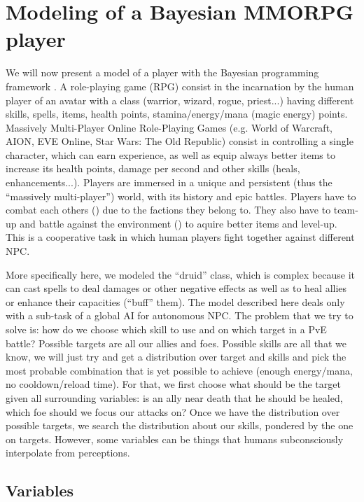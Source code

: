 \section{Modeling of a Bayesian MMORPG player}
We will now present a model of a  player with the Bayesian programming framework \citep{SYNNAEVE:MMORPG}. A role-playing game (RPG) consist in the incarnation by the human player of an avatar with a class (warrior, wizard, rogue, priest...) having different skills, spells, items, health points, stamina/energy/mana (magic energy) points. Massively Multi-Player Online Role-Playing Games (e.g. World of Warcraft, AION, EVE Online, Star Wars: The Old Republic) consist in controlling a single character, which can earn experience, as well as equip always better items to increase its health points, damage per second and other skills (heals, enhancements...). Players are immersed in a unique and persistent (thus the ``massively multi-player'') world, with its history and epic battles. Players have to combat each others () due to the factions they belong to. They also have to team-up and battle against the environment () to aquire better items and level-up. This is a cooperative task in which human players fight together against different NPC. 


More specifically here, we modeled the ``druid'' class, which is complex because it can cast spells to deal damages or other negative effects as well as to heal allies or enhance their capacities (``buff'' them). The model described here deals only with a sub-task of a global AI for autonomous NPC. The problem that we try to solve is: how do we choose which skill to use and on which target in a PvE battle? Possible targets are all our allies and foes. Possible skills are all that we know, we will just try and get a distribution over target and skills and pick the most probable combination that is yet possible to achieve (enough energy/mana, no cooldown/reload time). For that, we first choose what should be the target given all surrounding variables: is an ally near death that he should be healed, which foe should we focus our attacks on? Once we have the distribution over possible targets, we search the distribution about our skills, pondered by the one on targets. However, some variables can be things that humans subconsciously interpolate from perceptions.

\subsection{Variables}

